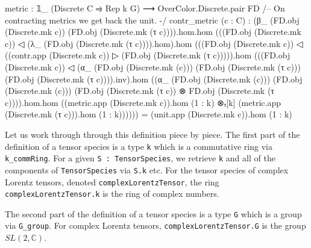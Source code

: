 \documentclass[a4paper, 11pt]{article}
\DeclareRobustCommand{\myinline}{\lstinline}
\begin{document}
\begin{codeLong}
  metric : 𝟙_ (Discrete C ⥤ Rep k G) ⟶ OverColor.Discrete.pair FD
  /-- On contracting metrics we get back the unit. -/
  contr_metric (c : C) :
    (β_ (FD.obj (Discrete.mk c)) (FD.obj (Discrete.mk (τ c)))).hom.hom
    (((FD.obj (Discrete.mk c)) ◁ (λ_ (FD.obj (Discrete.mk (τ c)))).hom).hom
    (((FD.obj (Discrete.mk c)) ◁ ((contr.app (Discrete.mk c)) ▷
    (FD.obj (Discrete.mk (τ c))))).hom
    (((FD.obj (Discrete.mk c)) ◁ (α_ (FD.obj (Discrete.mk (c)))
      (FD.obj (Discrete.mk (τ c))) (FD.obj (Discrete.mk (τ c)))).inv).hom
    ((α_ (FD.obj (Discrete.mk (c))) (FD.obj (Discrete.mk (c)))
      (FD.obj (Discrete.mk (τ c)) ⊗ FD.obj (Discrete.mk (τ c)))).hom.hom
    ((metric.app (Discrete.mk c)).hom (1 : k) ⊗ₜ[k]
      (metric.app (Discrete.mk (τ c))).hom (1 : k))))))
    = (unit.app (Discrete.mk c)).hom (1 : k)
\end{codeLong}

Let us work through through this definition piece by piece.
The first part of the definition of a tensor species is a type \myinline|k| 
which is a commutative ring via \myinline|k_commRing|. 
For a given \myinline|S : TensorSpecies|, we retrieve \myinline|k| and all of the 
components of \myinline|TensorSpecies| via \myinline|S.k| etc. 
For the tensor species of complex Lorentz tensors, denoted 
\myinline|complexLorentzTensor|, the ring \myinline|complexLorentzTensor.k| is the ring of complex numbers.

The second part of the definition of a tensor species is a type \myinline|G| 
which is a group via \myinline|G_group|. For complex Lorentz tensors, 
\myinline|complexLorentzTensor.G| is the group $SL(2, \mathbb{C})$.
\end{document}
